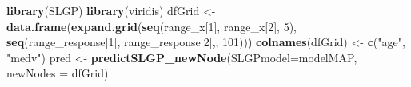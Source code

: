 \documentclass[
]{article}
\newenvironment{Shaded}{\begin{snugshade}}{\end{snugshade}}
\newcommand{\AttributeTok}[1]{\textcolor[rgb]{0.13,0.29,0.53}{#1}}
\newcommand{\DecValTok}[1]{\textcolor[rgb]{0.00,0.00,0.81}{#1}}
\newcommand{\FunctionTok}[1]{\textcolor[rgb]{0.13,0.29,0.53}{\textbf{#1}}}
\newcommand{\NormalTok}[1]{#1}
\newcommand{\OtherTok}[1]{\textcolor[rgb]{0.56,0.35,0.01}{#1}}
\newcommand{\StringTok}[1]{\textcolor[rgb]{0.31,0.60,0.02}{#1}}
\begin{document}
\begin{Shaded}
\begin{Highlighting}[]


\FunctionTok{library}\NormalTok{(SLGP)}
\FunctionTok{library}\NormalTok{(viridis)}
\NormalTok{dfGrid }\OtherTok{\textless{}{-}} \FunctionTok{data.frame}\NormalTok{(}\FunctionTok{expand.grid}\NormalTok{(}\FunctionTok{seq}\NormalTok{(range\_x[}\DecValTok{1}\NormalTok{], range\_x[}\DecValTok{2}\NormalTok{], }\DecValTok{5}\NormalTok{), }
                                 \FunctionTok{seq}\NormalTok{(range\_response[}\DecValTok{1}\NormalTok{], range\_response[}\DecValTok{2}\NormalTok{],, }\DecValTok{101}\NormalTok{)))}
\FunctionTok{colnames}\NormalTok{(dfGrid) }\OtherTok{\textless{}{-}} \FunctionTok{c}\NormalTok{(}\StringTok{"age"}\NormalTok{, }\StringTok{"medv"}\NormalTok{)}
\NormalTok{pred }\OtherTok{\textless{}{-}} \FunctionTok{predictSLGP\_newNode}\NormalTok{(}\AttributeTok{SLGPmodel=}\NormalTok{modelMAP,}
                            \AttributeTok{newNodes =}\NormalTok{ dfGrid)}


\end{Highlighting}
\end{Shaded}
\end{document}
